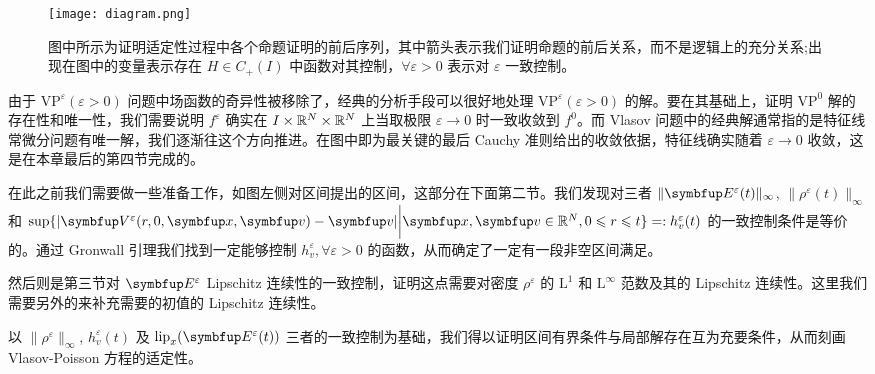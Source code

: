 \begin{figure}[h]
    \centering
    \texttt{[image: diagram.png]}
    \caption{图中所示为证明适定性过程中各个命题证明的前后序列，其中箭头表示我们证明命题的前后关系，而不是逻辑上的充分关系;出现在图中的变量表示存在 $H\in C_+(I)$ 中函数对其控制，$\forall \varepsilon>0$ 表示对 $\varepsilon$ 一致控制。}
    \label{fig:diagram}
  \end{figure}
  
由于 $\text{VP}^\varepsilon (\varepsilon >0)$ 问题中场函数的奇异性被移除了，经典的分析手段可以很好地处理 $\text{VP}^\varepsilon (\varepsilon >0)$ 的解。要在其基础上，证明 $\text{VP}^0$ 解的存在性和唯一性，我们需要说明 $f^\varepsilon$ 确实在 $I\times {\mathbb{R}}^N \times {\mathbb{R}}^N $ 上当取极限 $\varepsilon\rightarrow 0 $ 时一致收敛到 $f^0$。而 Vlasov 问题中的经典解通常指的是特征线常微分问题有唯一解，我们逐渐往这个方向推进。在图中即为最关键的最后 Cauchy 准则给出的收敛依据，特征线确实随着 $\varepsilon\rightarrow 0$ 收敛，这是在本章最后的第四节完成的。

在此之前我们需要做一些准备工作，如图左侧对区间提出的区间\boundcondition，这部分在下面第二节。我们发现对三者 $\|\vE^\varepsilon(t)\|_\infty$, $\|\rho^\varepsilon(t)\|_\infty$ 和 $\sup \{|\vect{V}^\varepsilon(r,0,\vx,\vv)-\vv| \bigg|\vx,\vv \in \bbR^N, 0\leqslant r \leqslant t \}=:h_v^\varepsilon(t)$ 的一致控制条件是等价的。通过 Gronwall 引理我们找到一定能够控制 $h_v^\varepsilon,\forall \varepsilon>0$ 的函数，从而确定了一定有一段非空区间满足\boundcondition。

然后则是第三节对 $\vE^\varepsilon$ Lipschitz 连续性的一致控制，证明这点需要对密度 $\rho^\varepsilon$ 的 $\mathrm{L}^1$ 和 $\mathrm{L}^\infty$ 范数及其的 Lipschitz 连续性。这里我们需要另外的\lipOffVsphere 来补充需要的初值的 Lipschitz 连续性。

以 $\|\rho^\varepsilon\|_\infty$, $h_v^\varepsilon(t)$ 及 $\operatorname{lip}_x (\vE^\varepsilon(t))$ 三者的一致控制为基础，我们得以证明区间有界条件与局部解存在互为充要条件，从而刻画 Vlasov-Poisson 方程的适定性。


